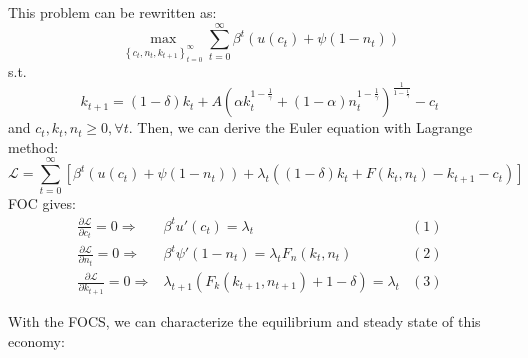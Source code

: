 \documentclass[10pt,landscape,a4paper]{article}
\begin{document}
\begin{multicols*}{3}
This problem can be rewritten as:
$$
\max_{\left\{c_t,n_t,k_{t+1}\right\}^{\infty}_{t=0}}\sum^{\infty}_{t=0}\beta^t\left(u(c_t)+\psi(1-n_t)\right)
$$
s.t. 
$$
k_{t+1}=(1-\delta)k_t + A\left(\alpha k_t^{1-\frac{1}{\gamma}}+(1-\alpha)n_t^{1-\frac{1}{\gamma}}\right)^{\frac{1}{1-\frac{1}{\gamma}}} - c_t 
$$
and $c_t,k_t,n_t\geq 0,\forall t$. Then, we can derive the Euler equation with Lagrange method:
$$\mathcal{L}= \sum^{\infty}_{t=0}\left[ \beta^t\left(u(c_t)+\psi(1-n_t)\right) +\lambda_t\left( (1-\delta)k_t + F(k_t,n_t)-k_{t+1}-c_t\right)  \right]$$
FOC gives:
\begin{align*}
    \frac{\partial \mathcal{L}}{\partial c_t}=0 \Rightarrow & \beta^t u'(c_t)=\lambda_t &(1)\\
    \frac{\partial \mathcal{L}}{\partial n_t}=0 \Rightarrow & \beta^t \psi'(1-n_t)= \lambda_t F_n(k_t,n_t) &(2)\\
    \frac{\partial \mathcal{L}}{\partial k_{t+1}}=0\Rightarrow & \lambda_{t+1}\left(F_k(k_{t+1},n_{t+1}) +1-\delta \right)=\lambda_t &(3)
\end{align*}

With the FOCS, we can characterize the equilibrium and steady state of this economy:

\vspace{2pt}


\end{multicols*}
\end{document}
